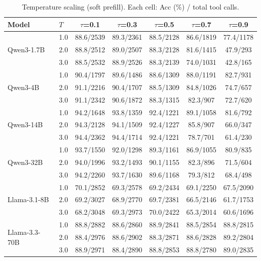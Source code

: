 \begin{table}[H]
\caption{Temperature scaling (soft prefill). Each cell: Acc (\%) / total tool calls.}
\label{tab:abl_temp}
\centering
\small
\setlength{\tabcolsep}{3pt}
\begin{tabular}{llccccc}
\toprule
Model & $T$ & $\tau$=0.1 & $\tau$=0.3 & $\tau$=0.5 & $\tau$=0.7 & $\tau$=0.9 \\
\midrule
\multirow{3}{*}{Qwen3-1.7B}
  & 1.0 & 88.6/2539 & 89.3/2361 & 88.5/2128 & 86.6/1819 & 77.4/1178 \\
  & 2.0 & 88.8/2512 & 89.0/2507 & 88.3/2128 & 81.6/1415 & 47.9/293 \\
  & 3.0 & 88.5/2532 & 88.9/2526 & 88.3/2139 & 74.0/1031 & 42.8/165 \\
\midrule
\multirow{3}{*}{Qwen3-4B}
  & 1.0 & 90.4/1797 & 89.6/1486 & 88.6/1309 & 88.0/1191 & 82.7/931 \\
  & 2.0 & 91.1/2216 & 90.4/1707 & 88.5/1309 & 84.8/1026 & 74.7/657 \\
  & 3.0 & 91.1/2342 & 90.6/1872 & 88.3/1315 & 82.3/907  & 72.7/620 \\
\midrule
\multirow{3}{*}{Qwen3-14B}
  & 1.0 & 94.2/1648 & 93.8/1359 & 92.4/1221 & 89.1/1058 & 81.6/792 \\
  & 2.0 & 94.3/2128 & 94.1/1509 & 92.4/1227 & 85.8/907  & 66.0/347 \\
  & 3.0 & 94.4/2362 & 94.4/1714 & 92.4/1221 & 78.7/701  & 61.4/230 \\
\midrule
\multirow{3}{*}{Qwen3-32B}
  & 1.0 & 93.7/1550 & 92.0/1298 & 89.3/1161 & 86.9/1055 & 80.9/835 \\
  & 2.0 & 94.0/1996 & 93.2/1493 & 90.1/1155 & 82.3/896  & 71.5/604 \\
  & 3.0 & 94.2/2260 & 93.7/1630 & 89.6/1168 & 79.3/812  & 68.4/498 \\
\midrule
\multirow{3}{*}{Llama-3.1-8B}
  & 1.0 & 70.1/2852 & 69.3/2578 & 69.2/2434 & 69.1/2250 & 67.5/2090 \\
  & 2.0 & 69.2/3027 & 68.9/2770 & 69.7/2381 & 66.5/2146 & 61.7/1753 \\
  & 3.0 & 68.2/3048 & 69.3/2973 & 70.0/2422 & 65.3/2014 & 60.6/1696 \\
\midrule
\multirow{3}{*}{Llama-3.3-70B}
  & 1.0 & 88.8/2882 & 88.6/2860 & 88.9/2841 & 88.5/2854 & 88.8/2815 \\
  & 2.0 & 88.4/2976 & 88.6/2902 & 88.3/2871 & 88.6/2828 & 89.2/2804 \\
  & 3.0 & 88.9/2971 & 88.4/2890 & 88.8/2853 & 88.8/2780 & 89.0/2835 \\
\bottomrule
\end{tabular}
\end{table}

